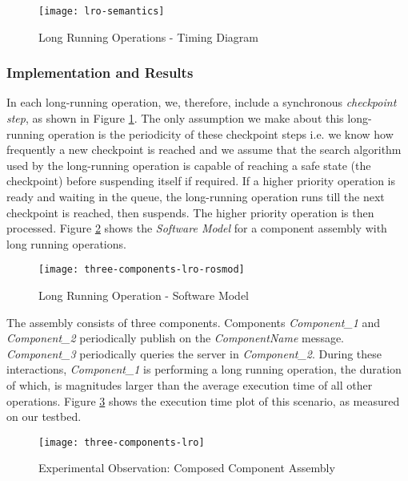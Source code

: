 \begin{figure}[h]
	\centering
	\texttt{[image: lro-semantics]}
	\caption{Long Running Operations - Timing Diagram}
	\label{fig:lro-semantics}
\end{figure}
\FloatBarrier

\subsubsection{Implementation and Results}

In each long-running operation, we, therefore, include a synchronous \emph{checkpoint step}, as shown in Figure \ref{fig:lro-semantics}. The only assumption we make about this long-running operation is the periodicity of these checkpoint steps i.e. we know how frequently a new checkpoint is reached and we assume that the search algorithm used by the long-running operation is capable of reaching a safe state (the checkpoint) before suspending itself if required. If a higher priority operation is ready and waiting in the queue, the long-running operation runs till the next checkpoint is reached, then suspends. The higher priority operation is then processed. Figure \ref{fig:three-components-lro-rosmod} shows the \emph{Software Model} for a component assembly with long running operations.

\begin{figure}[h]
	\centering
	\texttt{[image: three-components-lro-rosmod]}
	\caption{Long Running Operation - Software Model}
	\label{fig:three-components-lro-rosmod}
\end{figure}
\FloatBarrier

The assembly consists of three components. Components \emph{Component\_1} and \emph{Component\_2} periodically publish on the \emph{ComponentName} message. \emph{Component\_3} periodically queries the server in \emph{Component\_2}. During these interactions, \emph{Component\_1} is performing a long running operation, the duration of which, is magnitudes larger than the average execution time of all other operations. Figure \ref{fig:three-components-lro} shows the execution time plot of this scenario, as measured on our testbed. 

\begin{figure}[h]
	\centering
	\texttt{[image: three-components-lro]}
	\caption{Experimental Observation: Composed Component Assembly}
	\label{fig:three-components-lro}
\end{figure}
\FloatBarrier

